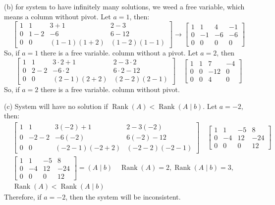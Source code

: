 \documentclass{article}
\begin{document}
\begin{enumerate}
(b) for system to have infinitely many solutions, we weed a free variable, which means a column without pivot.
Let $a=1$, then:
$$
\left[\begin{array}{ccc|c}
1 & 1 & 3+1 & 2-3 \\
0 & 1-2 & -6 & 6-12 \\
0 & 0 & (1-1)(1+2) & (1-2)(1-1)
\end{array}\right] \rightarrow\left[\begin{array}{ccc|c}
1 & 1 & 4 & -1 \\
0 & -1 & -6 & -6 \\
0 & 0 & 0 & 0
\end{array}\right]
$$
So, if $a=1$ there is a free variable. column without a pivot.
Let $a=2$, then
$$
\left[\begin{array}{ccc|c}
1 & 1 & 3 \cdot 2+1 & 2-3 \cdot 2 \\
0 & 2-2 & -6 \cdot 2 & 6 \cdot 2-12 \\
0 & 0 & (2-1)(2+2) & (2-2)(2-1)
\end{array}\right] \quad\left[\begin{array}{ccc|c}
1 & 1 & 7 & -4 \\
0 & 0 & -12 & 0 \\
0 & 0 & 4 & 0
\end{array}\right]
$$
So, if $a=2$ there is a free variable. column without pivot.

(c) System will have no solution if $\operatorname{Rank}(A)<\operatorname{Rank}(A \mid b)$. Let $a=-2$, then:
$$
\begin{aligned}
& {\left[\begin{array}{ccc|c}
1 & 1 & 3(-2)+1 & 2-3(-2) \\
0 & -2-2 & -6(-2) & 6(-2)-12 \\
0 & 0 & (-2-1)(-2+2) & (-2-2)(-2-1)
\end{array}\right] \quad\left[\begin{array}{ccc|c}
1 & 1 & -5 & 8 \\
0 & -4 & 12 & -24 \\
0 & 0 & 0 & 12
\end{array}\right]} \\
& {\left[\begin{array}{ccc|c}
1 & 1 & -5 & 8 \\
0 & -4 & 12 & -24 \\
0 & 0 & 0 & 12
\end{array}\right]=(A \mid b) \quad \operatorname{Rank}(A)=2, \operatorname{Rank}(A \mid b)=3,} \\
& \operatorname{Rank}(A)<\operatorname{Rank}(A \mid b)
\end{aligned}
$$
Therefore, if $a=-2$, then the system will be inconsistent.


\end{enumerate}
\end{document}
